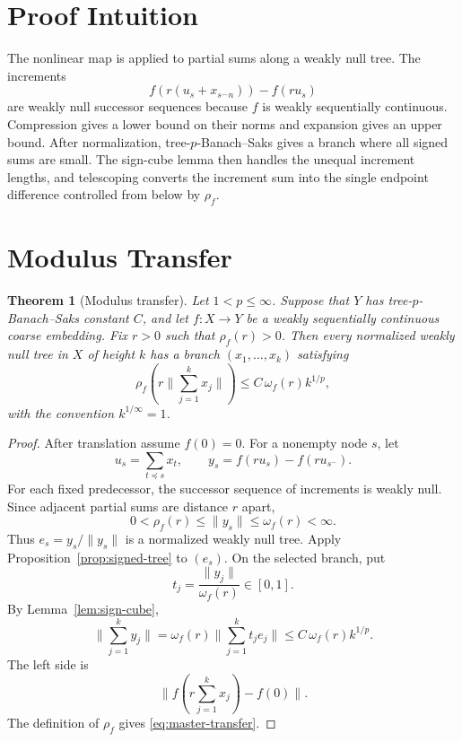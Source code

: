 \documentclass[11pt]{article}
\newtheorem{theorem}{Theorem}
\newcommand{\norm}[1]{\lVert #1\rVert}
\begin{document}
\section*{Proof Intuition}

The nonlinear map is applied to partial sums along a weakly null tree.  The
increments
\[
 f(r(u_s+x_{s^\frown n}))-f(ru_s)
\]
are weakly null successor sequences because \(f\) is weakly sequentially
continuous.  Compression gives a lower bound on their norms and expansion
gives an upper bound.  After normalization, tree-\(p\)-Banach--Saks gives a
branch where all signed sums are small.  The sign-cube lemma then handles the
unequal increment lengths, and telescoping converts the increment sum into the
single endpoint difference controlled from below by \(\rho_f\).

\section*{Modulus Transfer}

\begin{theorem}[Modulus transfer]\label{thm:modulus-transfer}
Let \(1<p\le\infty\).  Suppose that \(Y\) has tree-\(p\)-Banach--Saks
constant \(C\), and let \(f:X\to Y\) be a weakly sequentially continuous
coarse embedding.  Fix \(r>0\) such that \(\rho_f(r)>0\).  Then every
normalized weakly null tree in \(X\) of height \(k\) has a branch
\((x_1,\ldots,x_k)\) satisfying
\begin{equation}\label{eq:master-transfer}
 \rho_f\!\left(r\norm{\sum_{j=1}^k x_j}\right)
 \le C\,\omega_f(r)k^{1/p},
\end{equation}
with the convention \(k^{1/\infty}=1\).
\end{theorem}

\begin{proof}
After translation assume \(f(0)=0\).  For a nonempty node \(s\), let
\[
 u_s=\sum_{t\preceq s}x_t,\qquad
 y_s=f(ru_s)-f(ru_{s^-}).
\]
For each fixed predecessor, the successor sequence of increments is weakly
null.  Since adjacent partial sums are distance \(r\) apart,
\[
 0<\rho_f(r)\le\norm{y_s}\le\omega_f(r)<\infty.
\]
Thus \(e_s=y_s/\norm{y_s}\) is a normalized weakly null tree.  Apply
Proposition~\ref{prop:signed-tree} to \((e_s)\).  On the selected branch, put
\[
 t_j=\frac{\norm{y_j}}{\omega_f(r)}\in[0,1].
\]
By Lemma~\ref{lem:sign-cube},
\[
 \norm{\sum_{j=1}^k y_j}
 =\omega_f(r)\norm{\sum_{j=1}^k t_j e_j}
 \le C\,\omega_f(r)k^{1/p}.
\]
The left side is
\[
 \norm{f(r\sum_{j=1}^k x_j)-f(0)}.
\]
The definition of \(\rho_f\) gives \eqref{eq:master-transfer}.
\end{proof}
\end{document}
